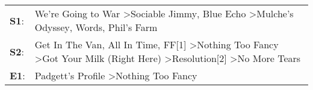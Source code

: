 \begin{supertabular}{p{0.03\textwidth}p{0.92\textwidth}}
 \textbf{S1}:  &                                                                                 We're Going to War\textsuperscript{} \textgreater \enspace Sociable Jimmy\textsuperscript{}, \enspace Blue Echo\textsuperscript{} \textgreater \enspace Mulche's Odyssey\textsuperscript{}, \enspace Words\textsuperscript{}, \enspace Phil's Farm\textsuperscript{}  \enspace  \\
 \textbf{S2}:  &  Get In The Van\textsuperscript{}, \enspace All In Time\textsuperscript{}, \enspace FF[1]\textsuperscript{} \textgreater \enspace Nothing Too Fancy\textsuperscript{} \textgreater \enspace Got Your Milk (Right Here)\textsuperscript{} \textgreater \enspace Resolution[2]\textsuperscript{} \textgreater \enspace No More Tears\textsuperscript{}  \enspace  \\
 \textbf{E1}:  &                                                                                                                                                                                                                                                        Padgett's Profile\textsuperscript{} \textgreater \enspace Nothing Too Fancy\textsuperscript{}  \enspace  \\
\end{supertabular}
